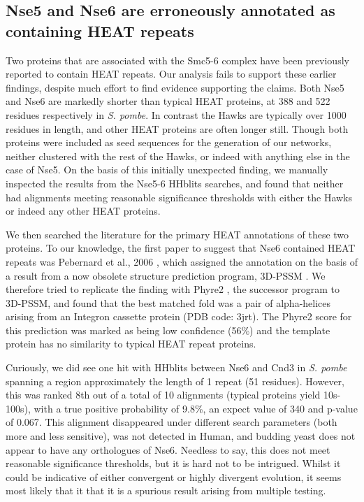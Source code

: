 \documentclass[a4paper,11pt,twoside,openright]{scrbook}
\begin{document}
\subsection{Nse5 and Nse6 are erroneously annotated as containing HEAT repeats}
Two proteins that are associated with the Smc5-6 complex have been previously reported to contain HEAT repeats. Our analysis fails to support these earlier findings, despite much effort to find evidence supporting the claims. Both Nse5 and Nse6 are markedly shorter than typical HEAT proteins, at 388 and 522 residues respectively in \textit{S. pombe}. In contrast the Hawks are typically over 1000 residues in length, and other HEAT proteins are often longer still. Though both proteins were included as seed sequences for the generation of our networks, neither clustered with the rest of the Hawks, or indeed with anything else in the case of Nse5. On the basis of this initially unexpected finding, we manually inspected the results from the Nse5-6 HHblits searches, and found that neither had alignments meeting reasonable significance thresholds with either the Hawks or indeed any other HEAT proteins.


We then searched the literature for the primary HEAT annotations of these two proteins. To our knowledge, the first paper to suggest that Nse6 contained HEAT repeats was Pebernard et al., 2006 \cite{Pebernard2006}, which assigned the annotation on the basis of a result from a now obsolete structure prediction program, 3D-PSSM \cite{Kelley2000}. We therefore tried to replicate the finding with Phyre2 \cite{Kelley2015}, the successor program to 3D-PSSM, and found that the best matched fold was a pair of alpha-helices arising from an Integron cassette protein (PDB code: 3jrt). The Phyre2 score for this prediction was marked as being low confidence (56\%) and the template protein has no similarity to typical HEAT repeat proteins.

Curiously, we did see one hit with HHblits between Nse6 and Cnd3 in \textit{S. pombe} spanning a region approximately the length of 1 repeat (51 residues). However, this was ranked 8th out of a total of 10 alignments (typical proteins yield 10s-100s), with a true positive probability of 9.8\%, an expect value of 340 and p-value of 0.067. This alignment disappeared under different search parameters (both more and less sensitive), was not detected in Human, and budding yeast does not appear to have any orthologues of Nse6. Needless to say, this does not meet reasonable significance thresholds, but it is hard not to be intrigued. Whilst it could be indicative of either convergent or highly divergent evolution, it seems most likely that it that it is a spurious result arising from multiple testing.
\end{document}
